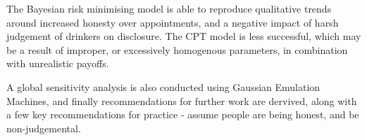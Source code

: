 The Bayesian risk minimising model is able to reproduce qualitative
trends around increased honesty over appointments, and a negative
impact of harsh judgement of drinkers on disclosure. The \ac{CPT}
model is less successful, which may be a result of improper, or excessively
homogenous parameters, in combination with unrealistic payoffs.

A global sensitivity analysis is also conducted using Gaussian Emulation
Machines, and finally recommendations for further work are dervived, along
with a few key recommendations for practice - assume people are being honest,
and be non-judgemental.

\vfill{}


\endgroup

